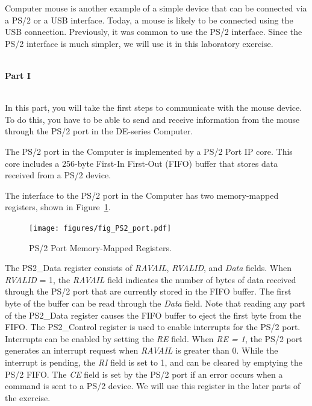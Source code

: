 \documentclass[epsfig,10pt,fullpage]{article}
\begin{document}
Computer mouse is another example of a simple device that can be connected via a PS/2 or a USB interface. Today, a mouse is likely to be connected using the USB connection. Previously, it was common to use the PS/2 interface. Since the PS/2 interface is much simpler, we will use it in this laboratory exercise.

~\\
\noindent
{\bf Part I}

~\\
\noindent
In this part, you will take the first steps to communicate with the mouse device. To do this, you have to be able to send and receive information from the mouse through the PS/2 port in the DE-series Computer.

The PS/2 port in the Computer is implemented by a PS/2 Port IP core. This core includes a 256-byte First-In First-Out (FIFO) buffer that stores data received from a PS/2 device.

The interface to the PS/2 port in the Computer has two memory-mapped registers, shown in Figure~\ref{fig:ps2_registers}.

\begin{figure}[H]
	\centering
	\texttt{[image: figures/fig\_PS2\_port.pdf]}
	\caption{PS/2 Port Memory-Mapped Registers.}
	\label{fig:ps2_registers}
\end{figure}

\noindent
The {\sf PS2\_Data} register consists of {\it RAVAIL}, {\it RVALID}, and {\it Data} fields. When {\it RVALID} = 1, the {\it RAVAIL} field indicates the number of
bytes of data received through the PS/2 port that are currently stored in the FIFO buffer. The first byte of the buffer can be read through the {\it Data} field. Note that reading any part of the {\sf PS2\_Data} register causes the FIFO buffer to eject the first byte from the FIFO. The {\sf PS2\_Control} register is used to enable interrupts for the PS/2 port. Interrupts can be enabled by setting the {\it RE} field. When {\it RE = 1}, the PS/2 port generates an interrupt request when {\it RAVAIL} is greater than 0. While the interrupt is pending, the {\it RI} field is set to 1, and can be cleared by emptying the PS/2 FIFO. The {\it CE} field is set by the PS/2 port if an error occurs when a command is sent to a PS/2 device. We will use this register in the later parts of the exercise.
\end{document}
